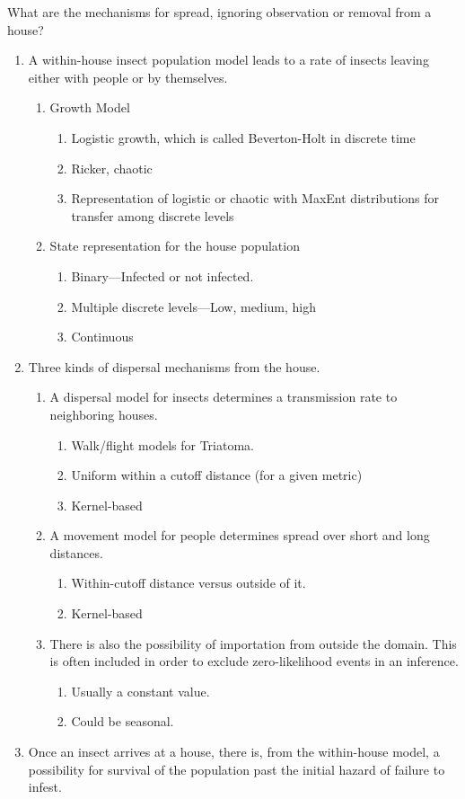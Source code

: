\documentclass{article}
\begin{document}
What are the mechanisms for spread, ignoring observation
or removal from a house?
\begin{enumerate}
  \item A within-house insect population model leads to a rate of
insects leaving either with people or by themselves.
  \begin{enumerate}
    \item Growth Model
    \begin{enumerate}
      \item Logistic growth, which is called Beverton-Holt in discrete time
      \item Ricker, chaotic
      \item Representation of logistic or chaotic with MaxEnt distributions for transfer among discrete levels
    \end{enumerate}
    \item State representation for the house population
    \begin{enumerate}
      \item Binary---Infected or not infected.
      \item Multiple discrete levels---Low, medium, high
      \item Continuous
    \end{enumerate}
  \end{enumerate}
  \item Three kinds of dispersal mechanisms from the house.
    \begin{enumerate}
    \item A dispersal model for insects determines a transmission rate
to neighboring houses.
    \begin{enumerate}
      \item Walk/flight models for Triatoma.
      \item Uniform within a cutoff distance (for a given metric)
      \item Kernel-based
    \end{enumerate}
    \item A movement model for people
determines spread over short and long distances.
    \begin{enumerate}
      \item Within-cutoff distance versus outside of it.
      \item Kernel-based
    \end{enumerate}
    \item There
is also the possibility of importation from outside the domain.
This is often included in order to exclude zero-likelihood
events in an inference.
    \begin{enumerate}
      \item Usually a constant value.
      \item Could be seasonal.
    \end{enumerate}
    \end{enumerate}
  \item Once an insect arrives at a house, there is, from the
within-house model, a possibility for survival of the population
past the initial hazard of failure to infest.
\end{enumerate}
\end{document}

